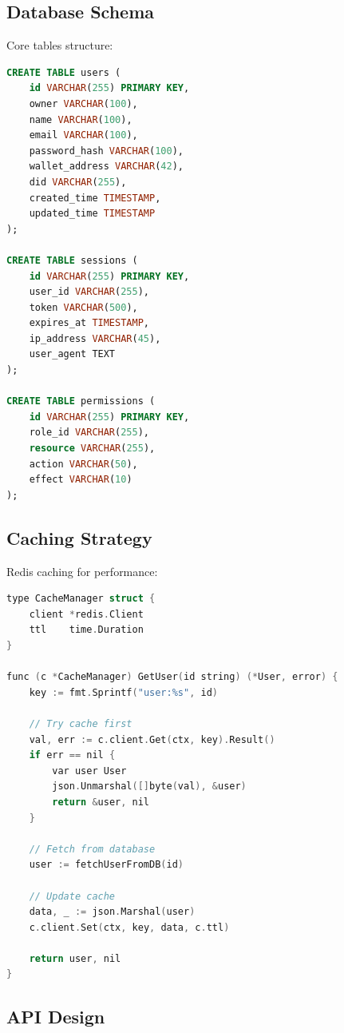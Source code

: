 \documentclass[11pt,a4paper]{article}
\begin{document}
\subsection{Database Schema}

Core tables structure:

\begin{lstlisting}[language=SQL]
CREATE TABLE users (
    id VARCHAR(255) PRIMARY KEY,
    owner VARCHAR(100),
    name VARCHAR(100),
    email VARCHAR(100),
    password_hash VARCHAR(100),
    wallet_address VARCHAR(42),
    did VARCHAR(255),
    created_time TIMESTAMP,
    updated_time TIMESTAMP
);

CREATE TABLE sessions (
    id VARCHAR(255) PRIMARY KEY,
    user_id VARCHAR(255),
    token VARCHAR(500),
    expires_at TIMESTAMP,
    ip_address VARCHAR(45),
    user_agent TEXT
);

CREATE TABLE permissions (
    id VARCHAR(255) PRIMARY KEY,
    role_id VARCHAR(255),
    resource VARCHAR(255),
    action VARCHAR(50),
    effect VARCHAR(10)
);
\end{lstlisting}

\subsection{Caching Strategy}

Redis caching for performance:

\begin{lstlisting}[language=C]
type CacheManager struct {
    client *redis.Client
    ttl    time.Duration
}

func (c *CacheManager) GetUser(id string) (*User, error) {
    key := fmt.Sprintf("user:%s", id)

    // Try cache first
    val, err := c.client.Get(ctx, key).Result()
    if err == nil {
        var user User
        json.Unmarshal([]byte(val), &user)
        return &user, nil
    }

    // Fetch from database
    user := fetchUserFromDB(id)

    // Update cache
    data, _ := json.Marshal(user)
    c.client.Set(ctx, key, data, c.ttl)

    return user, nil
}
\end{lstlisting}

\subsection{API Design}
\end{document}
